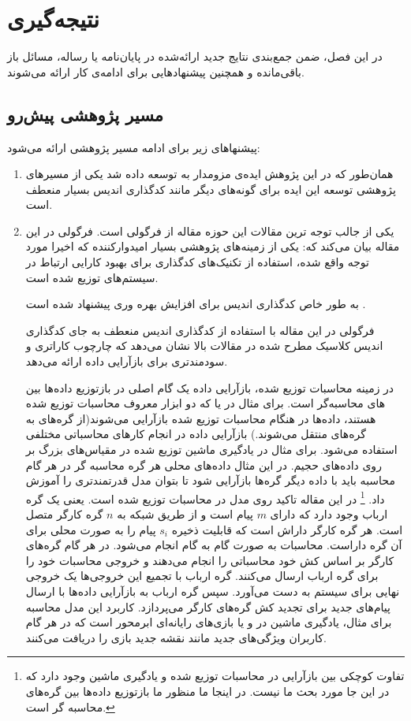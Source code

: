 \chapter{نتیجه‌گیری}
در این فصل، ضمن جمع‌بندی نتایج جدید ارائه‌شده در پایان‌نامه یا رساله،
مسائل باز باقی‌مانده و همچنین پیشنهادهایی برای ادامه‌ی کار ارائه می‌شوند.


\section{مسیر پژوهشی پیش‌رو}
پیشنهاهای زیر برای ادامه مسیر پژوهشی ارائه می‌شود:
\begin{enumerate}
	\item 
	همان‌طور که در این پژوهش ایده‌ی مزومدار به 
	\picod
	توسعه داده شد یکی از مسیرهای پژوهشی توسعه این ایده برای گونه‌های دیگر مانند کدگذاری اندیس بسیار منعطف است.
	\item 
	یکی از جالب توجه ترین مقالات این حوزه مقاله
	\cite{datashuf}
	از فرگولی است. فرگولی در این مقاله بیان می‌کند که: یکی از زمینه‌های پژوهشی بسیار امیدوارکننده که اخیرا مورد توجه واقع شده، استفاده از تکنیک‌های کدگذاری برای بهبود کارایی ارتباط در سیستم‌های توزیع شده است.
	\cite{Li2015CodedM, 7841903, 8002642, 8051074}
	
	به طور خاص کدگذاری اندیس برای افزایش بهره وری 
	پیشنهاد شده است
	\cite{8002642, 8051074}. 

فرگولی در این مقاله با استفاده از کدگذاری اندیس منعطف به جای کدگذاری اندیس کلاسیک مطرح شده در مقالات بالا نشان می‌دهد که 
\picod
چارچوب کاراتری و سودمندتری برای بازآرایی داده ارائه می‌دهد.

در زمینه محاسبات توزیع شده، بازآرایی داده یک گام اصلی در بازتوزیع داده‌ها بین 
های محاسبه‌گر است. برای مثال در
یا
که دو ابزار معروف محاسبات توزیع شده هستند، داده‌ها در هنگام محاسبات توزیع شده بازآرایی می‌شوند(از گره‌های 
 به گره‌های 
 منتقل می‌شوند.) بازآرایی داده در انجام کارهای محاسباتی مختلفی استفاده می‌شود. برای مثال در یادگیری ماشین توزیع شده در مقیاس‌های بزرگ بر روی داده‌های حجیم. در این مثال داده‌های محلی هر گره محاسبه گر در هر گام محاسبه باید با داده دیگر گره‌ها بازآرایی شود تا بتوان مدل قدرتمندتری را آموزش داد.
 \footnote{تفاوت کوچکی بین بازآرایی در محاسبات توزیع شده و یادگیری ماشین وجود دارد که در این جا مورد بحث ما نیست. در اینجا ما منظور ما بازتوزیع داده‌ها بین گره‌های محاسبه گر است.}
 در این مقاله تاکید روی مدل
 در محاسبات توزیع شده است. یعنی یک گره ارباب وجود دارد که دارای
 $m$
 پیام است و از طریق شبکه به
 $n$
 گره کارگر متصل است. هر گره کارگر داراش
 است که قابلیت ذخیره
 $s_i$
پیام را به صورت محلی برای آن گره داراست. محاسبات به صورت گام به گام انجام می‌شود. در هر گام گره‌های کارگر بر اساس کش خود محاسباتی را انجام می‌دهند و خروجی محاسبات خود را برای گره ارباب ارسال می‌کنند. گره ارباب با تجمیع این خروجی‌ها یک خروجی نهایی برای سیستم به دست می‌آورد. سپس گره ارباب به بازآرایی داده‌ها با ارسال پیام‌های جدید برای تجدید کش گره‌های کارگر می‌پردازد. کاربرد این مدل محاسبه برای مثال، یادگیری ماشین در 
و یا بازی‌های رایانه‌ای ابرمحور است که در هر گام کاربران ویژگی‌های جدید مانند نقشه جدید بازی را دریافت می‌کنند.


\end{enumerate}
